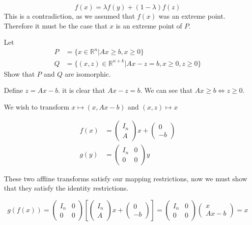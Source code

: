 \documentclass[12pt]{paper}
\newcommand{\setR}{ \mathbb{R} }
\begin{document}
\begin{equation*}
  f(x) = \lambda f(y) + (1-\lambda)f(z)
\end{equation*}
This is a contradiction, as we assumed that $f(x)$ was an extreme
point. Therefore it must be the case that $x$ is an extreme point of
$P$.

\vspace{.3in}
Let
\begin{align*}
  P &= \{ x \in \setR^n \vert Ax \geq b, x \geq 0 \}\\
  Q &= \{ (x,z) \in \setR^{n+k} \vert Ax- z  = b, x \geq 0, z \geq 0 \}
\end{align*}
Show that $P$ and $Q$ are isomorphic.

\vspace{.3in}

Define $z = Ax - b$. it is clear that $Ax -z = b$. We can see that $Ax
\geq b \Leftrightarrow z \geq 0$.

We wish to transform $x \mapsto (x, Ax-b)$ and $(x,z) \mapsto x$


\begin{align*}
  f(x) &=
  \begin{pmatrix}
    I_n\\
    A
  \end{pmatrix}x +
  \begin{pmatrix}
    0\\
    -b 
  \end{pmatrix}\\
  g(y) &=
         \begin{pmatrix}
           I_n & 0\\
           0 & 0
         \end{pmatrix}y
\end{align*}

These two affline transforms satisfy our mapping restrictions, now we
must show that they satisfy the identity restrictions.

\begin{equation*}
  g(f(x)) =
  \begin{pmatrix}
    I_n & 0\\
    0 & 0
  \end{pmatrix}
  \left[
    \begin{pmatrix}
      I_n\\
      A
    \end{pmatrix}x +
    \begin{pmatrix}
      0\\
      -b
    \end{pmatrix}
\right] =
\begin{pmatrix}
  I_n & 0\\
  0 & 0
\end{pmatrix}
\begin{pmatrix}
  x\\
  Ax - b
\end{pmatrix} = x
\end{equation*}
\end{document}
